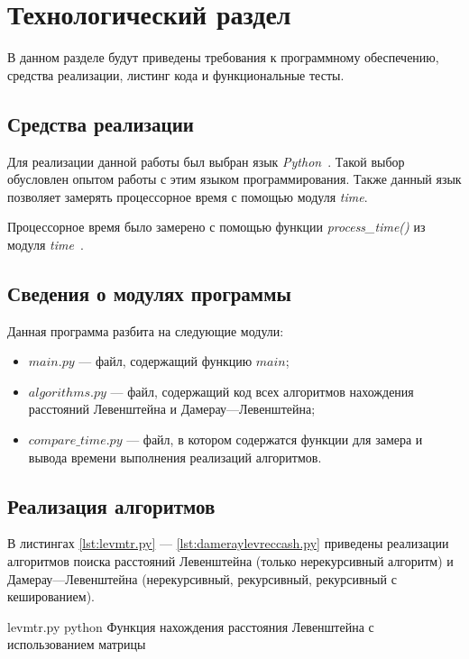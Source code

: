 \chapter{Технологический раздел}

В данном разделе будут приведены требования к программному обеспечению, средства реализации, листинг кода и функциональные тесты.

\section{Средства реализации}

Для реализации данной работы был выбран язык \textit{Python}~\cite{python}. Такой выбор обусловлен опытом работы с этим языком программирования. Также данный язык позволяет замерять процессорное время с помощью модуля \textit{time}.

Процессорное время было замерено с помощью функции \textit{process\_time()} из модуля \textit{time}~\cite{python-time}.

\section{Сведения о модулях программы}

Данная программа разбита на следующие модули:
\begin{itemize}
	\item $main.py$ --- файл, содержащий функцию $main$;
	\item $algorithms.py$ --- файл, содержащий код всех алгоритмов нахождения расстояний Левенштейна и Дамерау---Левенштейна;
	\item $compare\_time.py$ --- файл, в котором содержатся функции для замера и вывода времени выполнения реализаций алгоритмов.
\end{itemize}

\section{Реализация алгоритмов}

В листингах \ref{lst:levmtr.py} --- \ref{lst:dameraylevreccash.py} приведены реализации алгоритмов поиска расстояний Левенштейна (только нерекурсивный алгоритм) и Дамерау---Левенштейна (нерекурсивный, рекурсивный, рекурсивный с кешированием).

\clearpage

{levmtr.py} %
{python} %
{Функция нахождения расстояния Левенштейна с использованием матрицы} %

